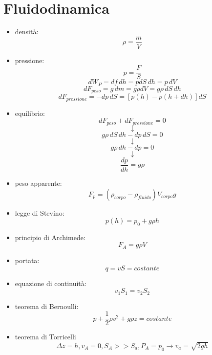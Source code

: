 \documentclass[a4paper,12pt, oneside]{book}
\begin{document}
\section{Fluidodinamica}
\begin{itemize}
\item densità:
$$\rho=\frac{m}{V}$$
\item pressione:
$$p=\frac{F}{S}$$
$$dW_P=df\,dh=pdS\,dh=p\,dV$$
$$dF_{peso}=g\,dm=g\rho dV=g\rho \,dS\,dh$$
$$dF_{pressione}=-dp\,dS=[p(h)-p(h+dh)]dS$$
\item equilibrio:
$$dF_{peso}+dF_{pressione}=0$$
$$\downarrow$$
$$g\rho \,dS\,dh-dp\,dS=0$$
$$\downarrow$$
$$g\rho \,dh-dp=0$$
$$\downarrow$$
$$\frac{dp}{dh}=g\rho$$
\item peso apparente:
$$F_p=(\rho_{corpo}-\rho_{fluido})V_{corpo}g$$
\item legge di Stevino:
$$p(h)=p_0+g\rho h$$
\item principio di Archimede:
$$F_A=g\rho V$$
\item portata:
$$q=vS=costante$$
\item equazione di continuità:
$$v_1S_1=v_2S_2$$
\item teorema di Bernoulli:
$$p+\frac{1}{2}\rho v^2+g\rho z =costante$$
\item teorema di Torricelli
$$\Delta z= h, v_A=0, S_A>>S_a, P_A=p_0\to v_a=\sqrt{2gh}$$
\end{itemize}
\end{document}
